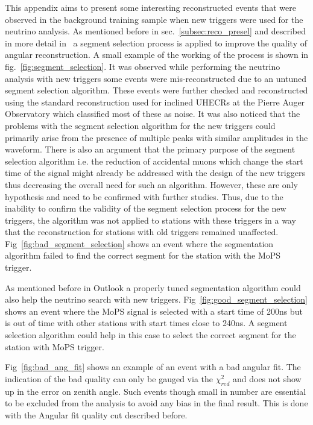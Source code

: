 This appendix aims to present some interesting reconstructed events that were observed in the background training sample when new triggers were used for the neutrino analysis. As mentioned before in sec.~\ref{subsec:reco_presel} and described in more detail in~\cite{gap_top_down_module} a segment selection process is applied to improve the quality of angular reconstruction. A small example of the working of the process is shown in fig.~\ref{fig:segment_selection}. It was observed while performing the neutrino analysis with new triggers some events were mis-reconstructed due to an untuned segment selection algorithm. These events were further checked and reconstructed using the standard reconstruction used for inclined UHECRs at the Pierre Auger Observatory which classified most of these as noise. It was also noticed that the problems with the segment selection algorithm for the new triggers could primarily arise from the presence of multiple peaks with similar amplitudes in the waveform. There is also an argument that the primary purpose of the segment selection algorithm i.e. the reduction of accidental muons which change the start time of the signal might already be addressed with the design of the new triggers thus decreasing the overall need for such an algorithm. However, these are only hypothesis and need to be confirmed with further studies. Thus, due to the inability to confirm the validity of the segment selection process for the new triggers, the algorithm was not applied to stations with these triggers in a way that the reconstruction for stations with old triggers remained unaffected. Fig~\ref{fig:bad_segment_selection} shows an event where the segmentation algorithm failed to find the correct segment for the station with the MoPS trigger. 

As mentioned before in Outlook a properly tuned segmentation algorithm could also help the neutrino search with new triggers. Fig~\ref{fig:good_segment_selection} shows an event where the MoPS signal is selected with a start time of 200ns but is out of time with other stations with start times close to 240ns. A segment selection algorithm could help in this case to select the correct segment for the station with MoPS trigger.

Fig~\ref{fig:bad_ang_fit} shows an example of an event with a bad angular fit. The indication of the bad quality can only be gauged via the $\chi^2_{red}$ and does not show up in the error on zenith angle. Such events though small in number are essential to be excluded from the analysis to avoid any bias in the final result. This is done with the Angular fit quality cut described before. 

